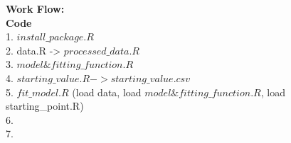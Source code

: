\textbf{Work Flow:} \\
\textbf{Code} \\
1. \(install\_package.R\) \\
2. data.R -> \(processed\_data.R\) \\
3. \(model\&fitting\_function.R\) \\
4. \(starting\_value.R -> starting\_value.csv\) \\
5. \(fit\_model.R\) (load data, load \(model\&fitting\_function.R\), load starting\_point.R) \\
6. \(\) \\
7. \(\) \\
